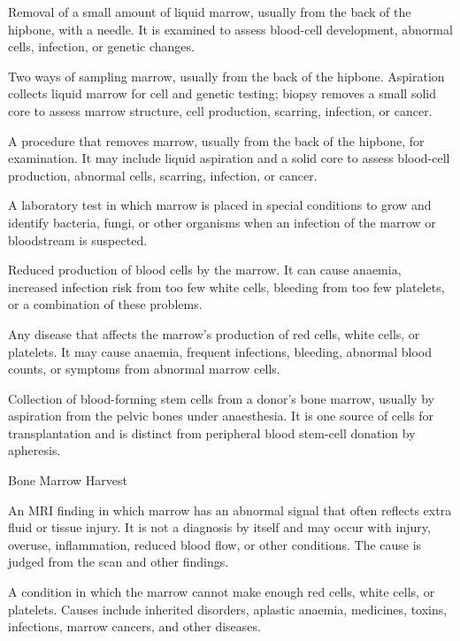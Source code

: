  Removal of a small amount of liquid marrow, usually from the back of the hipbone, with a needle. It is examined to assess blood-cell development, abnormal cells, infection, or genetic changes.

 Two ways of sampling marrow, usually from the back of the hipbone. Aspiration collects liquid marrow for cell and genetic testing; biopsy removes a small solid core to assess marrow structure, cell production, scarring, infection, or cancer.

 A procedure that removes marrow, usually from the back of the hipbone, for examination. It may include liquid aspiration and a solid core to assess blood-cell production, abnormal cells, scarring, infection, or cancer.

 A laboratory test in which marrow is placed in special conditions to grow and identify bacteria, fungi, or other organisms when an infection of the marrow or bloodstream is suspected.

 Reduced production of blood cells by the marrow. It can cause anaemia, increased infection risk from too few white cells, bleeding from too few platelets, or a combination of these problems.

 Any disease that affects the marrow's production of red cells, white cells, or platelets. It may cause anaemia, frequent infections, bleeding, abnormal blood counts, or symptoms from abnormal marrow cells.

 Collection of blood-forming stem cells from a
donor's bone marrow, usually by aspiration from the pelvic bones under
anaesthesia. It is one source of cells for transplantation and is distinct
from peripheral blood stem-cell donation by apheresis.

\synonyms
Bone Marrow Harvest

 An MRI finding in which marrow has an
  abnormal signal that often reflects extra fluid or tissue injury. It
  is not a diagnosis by itself and may occur with injury, overuse,
  inflammation, reduced blood flow, or other conditions. The cause is
  judged from the scan and other findings.

 A condition in which the marrow cannot make enough red cells, white cells, or platelets. Causes include inherited disorders, aplastic anaemia, medicines, toxins, infections, marrow cancers, and other diseases.

